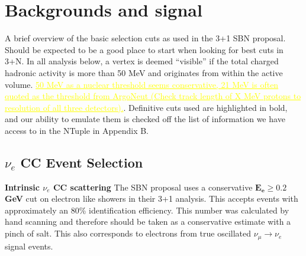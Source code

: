\documentclass[12pt, a4paper]{article}
\newcommand{\newtext}[2]{\textcolor{#1}{\ul{#2}}}
\begin{document}
\section{Backgrounds and signal}
A brief overview of the basic selection cuts as used in the 3+1 SBN proposal. Should be expected to be a good place to start when looking for best cuts in 3+N. In all analysis below, a vertex is deemed ``visible'' if the total charged hadronic activity is more than 50 MeV and originates from within the active volume. \newtext{MARK}{50 MeV as a nuclear threshold seems conservative, 21 MeV is often quoted as the threshold from ArgoNeut (Check track length of X MeV protons to resolution of all three detectors).}. Definitive cuts used are highlighted in bold, and our ability to emulate them is checked off the list of information we have access to in the NTuple in Appendix B.\\


\subsection{$\nu_e$ CC Event Selection}
{\bf Intrinsic $\nu_e$ CC scattering}
The SBN proposal uses a conservative $\bm{E_e \geq 0.2}${\bf GeV} cut on electron like showers in their 3+1 analysis. This accepts events with approximately an 80\% identification efficiency. This number was calculated by hand scanning and therefore should be taken as a conservative estimate with a pinch of salt. This also corresponds to electrons from true oscillated $\nu_\mu \rightarrow \nu_e$ signal events. \\
\end{document}
